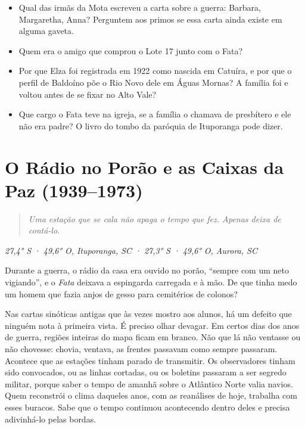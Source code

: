 \documentclass[
  brazilian,
  11pt,
  openany]{book}
\providecommand{\tightlist}{%
  \setlength{\itemsep}{0pt}\setlength{\parskip}{0pt}}
\begin{document}
\begin{itemize}
\tightlist
\item
  Qual das irmãs da Mota escreveu a carta sobre a guerra: Barbara,
  Margaretha, Anna? Perguntem aos primos se essa carta ainda existe em
  alguma gaveta.
\item
  Quem era o amigo que comprou o Lote 17 junto com o Fata?
\item
  Por que Elza foi registrada em 1922 como nascida em Catuíra, e por que
  o perfil de Baldoíno põe o Rio Novo dele em Águas Mornas? A família
  foi e voltou antes de se fixar no Alto Vale?
\item
  Que cargo o Fata teve na igreja, se a família o chamava de presbítero
  e ele não era padre? O livro do tombo da paróquia de Ituporanga pode
  dizer.
\end{itemize}

\chapter{O Rádio no Porão e as Caixas da Paz (1939--1973)}\label{cap-7}

\begin{quote}
\emph{Uma estação que se cala não apaga o tempo que fez. Apenas deixa de
contá-lo.}
\end{quote}

\emph{27,4° S · 49,6° O, Ituporanga, SC · 27,3° S · 49,6° O, Aurora, SC}

Durante a guerra, o rádio da casa era ouvido no porão, ``sempre com um
neto vigiando'', e o \emph{Fata} deixava a espingarda carregada e à mão.
De que tinha medo um homem que fazia anjos de gesso para cemitérios de
colonos?

Nas cartas sinóticas antigas que às vezes mostro aos alunos, há um
defeito que ninguém nota à primeira vista. É preciso olhar devagar. Em
certos dias dos anos de guerra, regiões inteiras do mapa ficam em
branco. Não que lá não ventasse ou não chovesse: chovia, ventava, as
frentes passavam como sempre passaram. Acontece que as estações tinham
parado de transmitir. Os observadores tinham sido convocados, ou as
linhas cortadas, ou os boletins passaram a ser segredo militar, porque
saber o tempo de amanhã sobre o Atlântico Norte valia navios. Quem
reconstrói o clima daqueles anos, com as reanálises de hoje, trabalha
com esses buracos. Sabe que o tempo continuou acontecendo dentro deles e
precisa adivinhá-lo pelas bordas.
\end{document}
